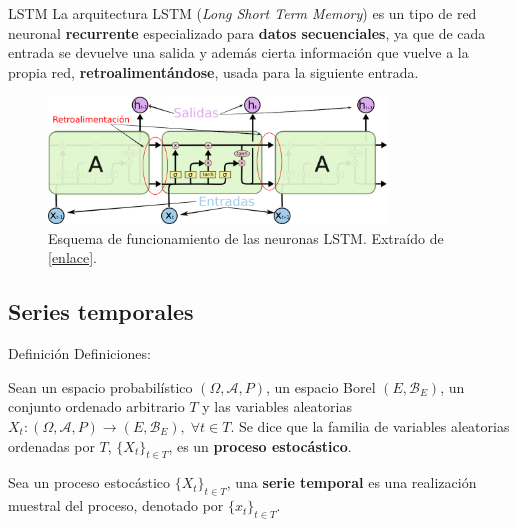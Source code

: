 \documentclass[spanish]{beamer}
\begin{document}
\begin{frame}{LSTM}
  La arquitectura LSTM (\emph{Long Short Term Memory}) es un tipo de red neuronal \textbf{recurrente} especializado para \textbf{datos secuenciales}, ya que de cada entrada se devuelve una salida y además cierta información que vuelve a la propia red, \textbf{retroalimentándose}, usada para la siguiente entrada.

  \begin{figure}
    \centering
    \includegraphics[width=0.8\textwidth]{img/lstm-cells}
    \caption{Esquema de funcionamiento de las neuronas LSTM. Extraído de \href{https://colah.github.io/posts/2015-08-Understanding-LSTMs/}{[enlace]}.}
  \end{figure}
\end{frame}

\subsection{Series temporales}

\begin{frame}{Definición}
  Definiciones:
  \pause

  \begin{definition}
    Sean un espacio probabilístico $(\Omega, \mathcal{A}, P)$, un espacio Borel $(E, \mathcal{B}_E)$, un conjunto ordenado arbitrario $T$ y las variables aleatorias $X_t : (\Omega, \mathcal{A}, P) \to (E, \mathcal{B}_E), \; \forall t \in T$. Se dice que la familia de variables aleatorias ordenadas por $T$, $\{X_t\}_{t \in T}$, es un \textbf{proceso estocástico}.
  \end{definition}

  \pause

  \begin{definition}
    Sea un proceso estocástico $\{X_t\}_{t \in T}$, una \textbf{serie temporal} es una realización muestral del proceso, denotado por $\{x_t\}_{t \in T}$.
  \end{definition}
\end{frame}
\end{document}
